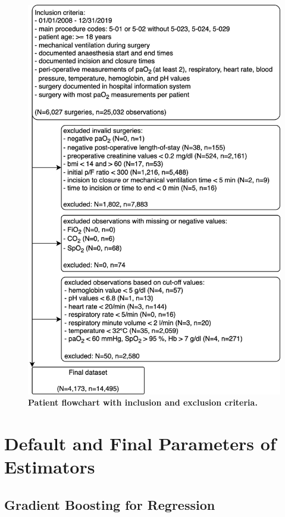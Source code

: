 \documentclass[referee,lineno,pdflatex,sn-nature]{sn-jnl}%
\theoremstyle{thmstyleone}%
\theoremstyle{thmstyletwo}%
\theoremstyle{thmstylethree}%
\begin{document}
\begin{appendices}
\begin{figure}[h]
    \centering
    \includegraphics[width=1\linewidth]{images/Figure8.png}
    \caption{\textbf{Patient flowchart with inclusion and exclusion criteria.} }
    \label{fig8}
\end{figure}

\section{Default and Final Parameters of Estimators}\label{secA4}

\subsection{Gradient Boosting for Regression}\label{secA4.1}


\end{appendices}
\end{document}
